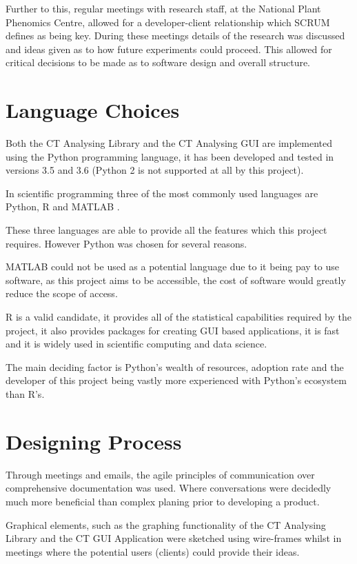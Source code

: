 \documentclass[11pt]{report}
\begin{document}
Further to this, regular meetings with research staff, at the National Plant Phenomics Centre,  allowed for a developer-client relationship which SCRUM defines as being key. During these meetings details of the research was discussed and ideas given as to how future experiments could proceed. This allowed for critical decisions to be made as to software design and overall structure.
\section{Language Choices}
\label{sec:org06dbf74}
Both the CT Analysing Library and the CT Analysing GUI are implemented using the Python programming language, it has been developed and tested in versions 3.5 and 3.6 (Python 2 is not supported at all by this project).

In scientific programming three of the most commonly used languages are Python, R and MATLAB \cite{Ozgur2016}.

These three languages are able to provide all the features which this project requires. However Python was chosen for several reasons.

MATLAB could not be used as a potential language due to it being pay to use software, as this project aims to be accessible, the cost of software would greatly reduce the scope of access.

R is a valid candidate, it provides all of the statistical capabilities required by the project, it also provides packages for creating GUI based applications, it is fast and it is widely used in scientific computing and data science.

The main deciding factor is Python's wealth of resources, adoption rate and the developer of this project being vastly more experienced with Python's ecosystem than R's.

\section{Designing Process}
\label{sec:org0b49482}
Through meetings and emails, the agile principles of communication over comprehensive documentation was used. Where conversations were decidedly much more beneficial than complex planing prior to developing a product.

Graphical elements, such as the graphing functionality of the CT Analysing Library and the CT GUI Application were sketched using wire-frames whilst in meetings where the potential users (clients) could provide their ideas.
\end{document}

